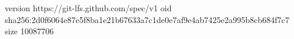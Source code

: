 version https://git-lfs.github.com/spec/v1
oid sha256:2d0f6064e87e5f8ba1e21b67633a7c1de0e7af9e4ab7425e2a995b8cb684f7c7
size 10087706
